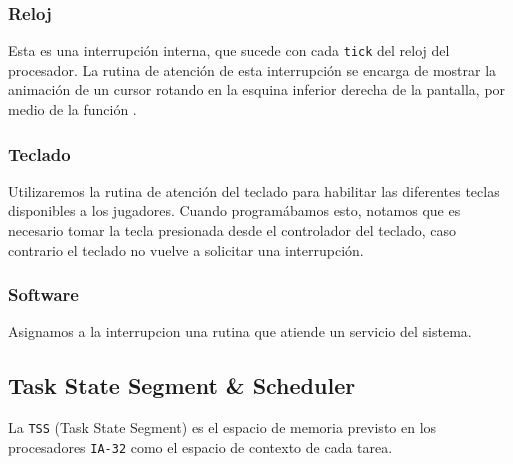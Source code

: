 \subsubsection{Reloj}

Esta es una interrupción interna, que sucede con cada \texttt{tick} del reloj del procesador. La rutina de atención de esta interrupción se encarga de mostrar la animación de un cursor rotando en la esquina inferior derecha de la pantalla, por medio de la función .

\subsubsection{Teclado}
Utilizaremos la rutina de atención del teclado para habilitar las diferentes teclas disponibles a los jugadores. Cuando programábamos esto, notamos que es necesario tomar la tecla presionada desde el controlador del teclado, caso contrario el teclado no vuelve a solicitar una interrupción.

\subsubsection{Software}
Asignamos a la interrupcion  una rutina que atiende un servicio del sistema.

\subsection{Task State Segment \& Scheduler}

La \texttt{TSS} (Task State Segment) es el espacio de memoria previsto en los procesadores \texttt{IA-32} como el espacio de contexto de cada tarea.